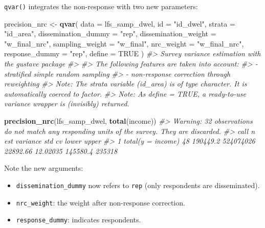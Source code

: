 \documentclass[
]{article}
\newenvironment{Shaded}{\begin{snugshade}}{\end{snugshade}}
\newcommand{\AttributeTok}[1]{\textcolor[rgb]{0.13,0.29,0.53}{#1}}
\newcommand{\CommentTok}[1]{\textcolor[rgb]{0.56,0.35,0.01}{\textit{#1}}}
\newcommand{\ConstantTok}[1]{\textcolor[rgb]{0.56,0.35,0.01}{#1}}
\newcommand{\FunctionTok}[1]{\textcolor[rgb]{0.13,0.29,0.53}{\textbf{#1}}}
\newcommand{\NormalTok}[1]{#1}
\newcommand{\OtherTok}[1]{\textcolor[rgb]{0.56,0.35,0.01}{#1}}
\newcommand{\StringTok}[1]{\textcolor[rgb]{0.31,0.60,0.02}{#1}}
\providecommand{\tightlist}{%
  \setlength{\itemsep}{0pt}\setlength{\parskip}{0pt}}
\begin{document}
\texttt{qvar()} integrates the non-response with two new parameters:

\begin{Shaded}
\begin{Highlighting}[]
\NormalTok{precision\_nrc }\OtherTok{\textless{}{-}} \FunctionTok{qvar}\NormalTok{(}
  \AttributeTok{data                 =}\NormalTok{ lfs\_samp\_dwel,}
  \AttributeTok{id                   =} \StringTok{"id\_dwel"}\NormalTok{,}
  \AttributeTok{strata               =} \StringTok{"id\_area"}\NormalTok{,}
  \AttributeTok{dissemination\_dummy  =} \StringTok{"rep"}\NormalTok{,}
  \AttributeTok{dissemination\_weight =} \StringTok{"w\_final\_nrc"}\NormalTok{,}
  \AttributeTok{sampling\_weight      =} \StringTok{"w\_final"}\NormalTok{,}
  \AttributeTok{nrc\_weight           =} \StringTok{"w\_final\_nrc"}\NormalTok{,}
  \AttributeTok{response\_dummy       =} \StringTok{"rep"}\NormalTok{,}
  \AttributeTok{define =} \ConstantTok{TRUE}
\NormalTok{)}
\CommentTok{\#\textgreater{} Survey variance estimation with the gustave package}
\CommentTok{\#\textgreater{} }
\CommentTok{\#\textgreater{} The following features are taken into account:}
\CommentTok{\#\textgreater{}   {-} stratified simple random sampling}
\CommentTok{\#\textgreater{}   {-} non{-}response correction through reweighting}
\CommentTok{\#\textgreater{} Note: The strata variable (id\_area) is of type character. It is automatically coerced to factor.}
\CommentTok{\#\textgreater{} Note: As define = TRUE, a ready{-}to{-}use variance wrapper is (invisibly) returned.}

\FunctionTok{precision\_nrc}\NormalTok{(lfs\_samp\_dwel, }\FunctionTok{total}\NormalTok{(income))}
\CommentTok{\#\textgreater{} Warning: 32 observations do not match any responding units of the survey. They are discarded.}
\CommentTok{\#\textgreater{}                call  n      est  variance      std       cv    lower  upper}
\CommentTok{\#\textgreater{} 1 total(y = income) 48 190449.2 524074026 22892.66 12.02035 145580.4 235318}
\end{Highlighting}
\end{Shaded}

Note the new arguments:

\begin{itemize}
\tightlist
\item
  \texttt{dissemination\_dummy} now refers to \texttt{rep} (only
  respondents are disseminated).
\item
  \texttt{nrc\_weight}: the weight after non-response correction.
\item
  \texttt{response\_dummy}: indicates respondents.
\end{itemize}
\end{document}
